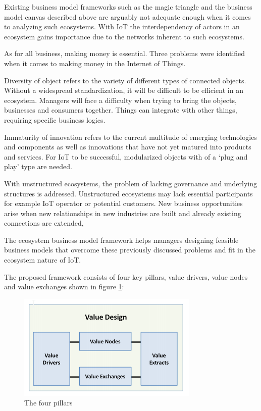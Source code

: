 		Existing business model frameworks such as the magic triangle and the business model canvas described above are arguably not adequate enough when it comes to analyzing such ecosystems. With IoT the interdependency of actors in an ecosystem gains importance due to the networks inherent to such ecosystems.

		As for all business, making money is essential. Three problems were identified  when it comes to making money in the Internet of Things.

		Diversity of object refers to the variety of different types of connected objects. Without a widespread standardization, it will be difficult to be efficient in an ecosystem. Managers will face a difficulty when trying to bring the objects, businesses and consumers together. Things can integrate with other things, requiring specific business logics.

		Immaturity of innovation refers to the current multitude of emerging technologies and components as well as innovations that have not yet matured into products and services. For IoT to be successful, modularized objects with of a `plug and play' type are needed.

		With unstructured ecosystems, the problem of lacking governance and underlying structures is addressed. Unstructured ecosystems may lack essential participants for example IoT operator or potential customers. New business opportunities arise when new relationships in new industries are built and already existing connections are extended,

		The ecosystem business model framework helps managers designing feasible business models that overcome these previously discussed problems and fit in the ecosystem nature of IoT. 

		The proposed framework consists of four key pillars, value drivers, value nodes and value exchanges shown in figure \ref{Westerlund pillars}:

			\begin{figure}[ht]
			    \begin{center}
			    \includegraphics[scale=1.0]{Talk11/westerlundpillars.png}
			    \end{center}
			    \caption{The four pillars}
			    \label{Westerlund pillars}
			\end{figure}

